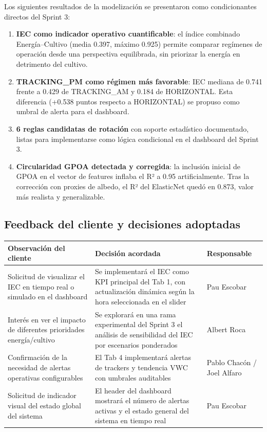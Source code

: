 \documentclass[11pt,a4paper]{article}
\begin{document}
Los siguientes resultados de la modelización se presentaron como condicionantes directos del
Sprint 3:

\begin{enumerate}
  \item \textbf{IEC como indicador operativo cuantificable}: el índice combinado Energía–Cultivo
    (media 0.397, máximo 0.925) permite comparar regímenes de operación desde una
    perspectiva equilibrada, sin priorizar la energía en detrimento del cultivo.
  \item \textbf{TRACKING\_PM como régimen más favorable}: IEC mediana de 0.741 frente a 0.429 de
    TRACKING\_AM y 0.184 de HORIZONTAL. Esta diferencia (+0.538 puntos respecto a
    HORIZONTAL) se propuso como umbral de alerta para el dashboard.
  \item \textbf{6 reglas candidatas de rotación} con soporte estadístico documentado, listas para
    implementarse como lógica condicional en el dashboard del Sprint 3.
  \item \textbf{Circularidad GPOA detectada y corregida}: la inclusión inicial de GPOA en el vector
    de features inflaba el R² a 0.95 artificialmente. Tras la corrección con proxies de albedo,
    el R² del ElasticNet quedó en 0.873, valor más realista y generalizable.
\end{enumerate}

\subsection{Feedback del cliente y decisiones adoptadas}

\begin{longtable}{p{} p{} p{}}
\textbf{Observación del cliente} & \textbf{Decisión acordada} & \textbf{Responsable} \\
\hline
Solicitud de visualizar el IEC en tiempo real o simulado en el dashboard & Se implementará el IEC como KPI principal del Tab 1, con actualización dinámica según la hora seleccionada en el slider & Pau Escobar \\
Interés en ver el impacto de diferentes prioridades energía/cultivo & Se explorará en una rama experimental del Sprint 3 el análisis de sensibilidad del IEC por escenarios ponderados & Albert Roca \\
Confirmación de la necesidad de alertas operativas configurables & El Tab 4 implementará alertas de trackers y tendencia VWC con umbrales auditables & Pablo Chacón / Joel Alfaro \\
Solicitud de indicador visual del estado global del sistema & El header del dashboard mostrará el número de alertas activas y el estado general del sistema en tiempo real & Pau Escobar \\
\end{longtable}
\end{document}
